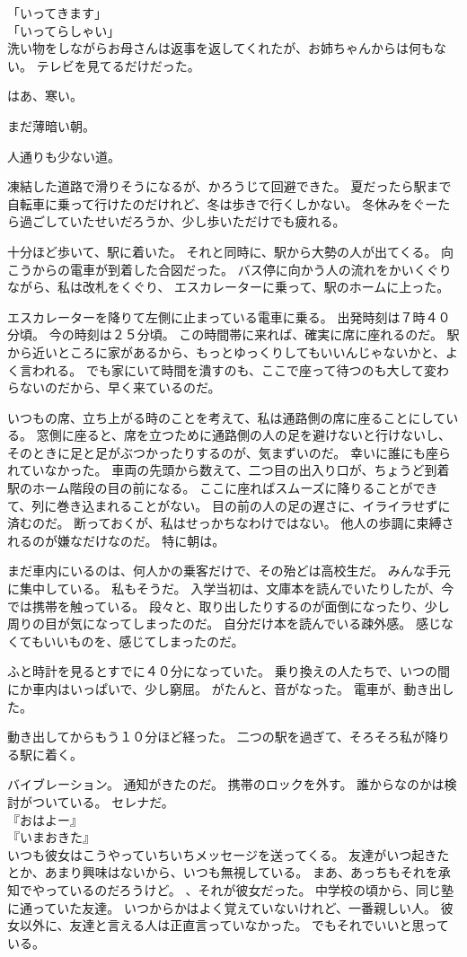 \documentclass[../IHMain]{subfiles}
\begin{document}
「いってきます」\\
「いってらしゃい」\\
洗い物をしながらお母さんは返事を返してくれたが、お姉ちゃんからは何もない。
テレビを見てるだけだった。

はあ、寒い。

まだ薄暗い朝。

人通りも少ない道。

凍結した道路で滑りそうになるが、かろうじて回避できた。
夏だったら駅まで自転車に乗って行けたのだけれど、冬は歩きで行くしかない。
冬休みをぐーたら過ごしていたせいだろうか、少し歩いただけでも疲れる。

十分ほど歩いて、駅に着いた。
それと同時に、駅から大勢の人が出てくる。
向こうからの電車が到着した合図だった。
バス停に向かう人の流れをかいくぐりながら、私は改札をくぐり、
エスカレーターに乗って、駅のホームに上った。

エスカレーターを降りて左側に止まっている電車に乗る。
出発時刻は７時４０分頃。
今の時刻は２５分頃。
この時間帯に来れば、確実に席に座れるのだ。
駅から近いところに家があるから、もっとゆっくりしてもいいんじゃないかと、よく言われる。
でも家にいて時間を潰すのも、ここで座って待つのも大して変わらないのだから、早く来ているのだ。

いつもの席、立ち上がる時のことを考えて、私は通路側の席に座ることにしている。
窓側に座ると、席を立つために通路側の人の足を避けないと行けないし、
そのときに足と足がぶつかったりするのが、気まずいのだ。
幸いに誰にも座られていなかった。
車両の先頭から数えて、二つ目の出入り口が、ちょうど到着駅のホーム階段の目の前になる。
ここに座ればスムーズに降りることができて、列に巻き込まれることがない。
目の前の人の足の遅さに、イライラせずに済むのだ。
断っておくが、私はせっかちなわけではない。
他人の歩調に束縛されるのが嫌なだけなのだ。
特に朝は。

まだ車内にいるのは、何人かの乗客だけで、その殆どは高校生だ。
みんな手元に集中している。
私もそうだ。
入学当初は、文庫本を読んでいたりしたが、今では携帯を触っている。
段々と、取り出したりするのが面倒になったり、少し周りの目が気になってしまったのだ。
自分だけ本を読んでいる疎外感。
感じなくてもいいものを、感じてしまったのだ。

ふと時計を見るとすでに４０分になっていた。
乗り換えの人たちで、いつの間にか車内はいっぱいで、少し窮屈。
がたんと、音がなった。
電車が、動き出した。

動き出してからもう１０分ほど経った。
二つの駅を過ぎて、そろそろ私が降りる駅に着く。

バイブレーション。
通知がきたのだ。
携帯のロックを外す。
誰からなのかは検討がついている。
セレナだ。\\
『おはよー』\\
『いまおきた』\\
いつも彼女はこうやっていちいちメッセージを送ってくる。
友達がいつ起きたとか、あまり興味はないから、いつも無視している。
まあ、あっちもそれを承知でやっているのだろうけど。
、それが彼女だった。
中学校の頃から、同じ塾に通っていた友達。
いつからかはよく覚えていないけれど、一番親しい人。
彼女以外に、友達と言える人は正直言っていなかった。
でもそれでいいと思っている。
\end{document}
